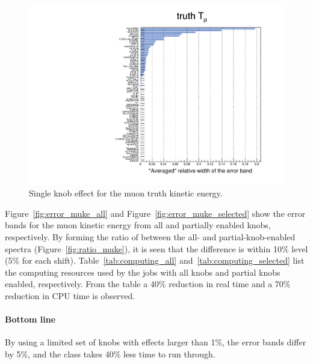 \documentclass[12pt,a4paper,final]{iopart}
\begin{document}
\begin{figure}[h]
  \centering
  \includegraphics[width=\textwidth]{figures/t_muke.pdf}
  \caption{Single knob effect for the muon truth kinetic energy.}
  \label{fig:true_mu_ke}
\end{figure}

Figure~\ref{fig:error_muke_all} and Figure~\ref{fig:error_muke_selected} show the error bands for the muon kinetic energy from all and partially enabled knobs, respectively. By forming the ratio of between the all- and partial-knob-enabled spectra (Figure~\ref{fig:ratio_muke}), it is seen that the difference is within 10\% level (5\% for each shift). Table~\ref{tab:computing_all} and~\ref{tab:computing_selected} list the computing resources used by the jobs with all knobs and partial knobs enabled, respectively. From the table a 40\% reduction in real time and a 70\% reduction in CPU time is observed.
\paragraph{Bottom line} By using a limited set of knobs with effects larger than 1\%, the error bands differ by 5\%, and the class takes 40\% less time to run through.
\end{document}
